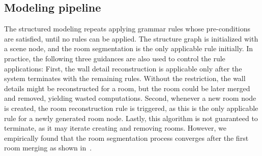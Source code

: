 


\subsection{Modeling pipeline}

The structured modeling repeats applying grammar rules whose
pre-conditions are satisfied, until no rules can be applied.  The
structure graph is initialized with a scene node, and the room
segmentation is the only applicable rule initially.  In practice, the
following three guidances are also used to control the rule applications:
First, the wall detail reconstruction is applicable only after the
system terminates with the remaining rules.  Without the restriction,
the wall details might be reconstructed for a room, but the room could
be later merged and removed, yielding wasted computations. Second,
whenever a new room node is created, the room reconstruction rule is
triggered, as this is the only applicable rule for a newly generated
room node.
Lastly, this algorithm is not guaranteed to terminate, as it may iterate
creating and removing rooms. However, we empirically found that the room
segmentation process converges after the first room merging as shown
in~.
 


